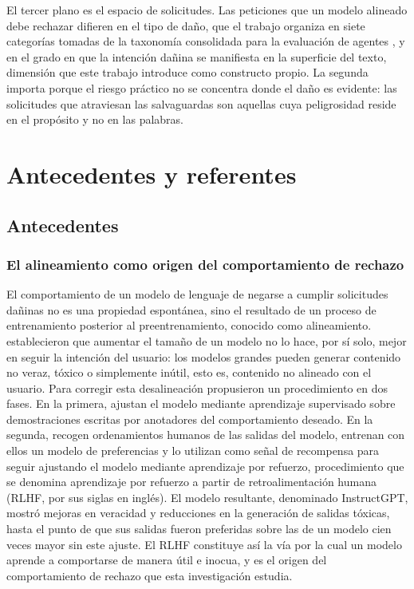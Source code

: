 El tercer plano es el espacio de solicitudes. Las peticiones que un modelo alineado debe rechazar difieren en el tipo de daño, que el trabajo organiza en siete categorías tomadas de la taxonomía consolidada para la evaluación de agentes \parencite{andriushchenko2024}, y en el grado en que la intención dañina se manifiesta en la superficie del texto, dimensión que este trabajo introduce como constructo propio. La segunda importa porque el riesgo práctico no se concentra donde el daño es evidente: las solicitudes que atraviesan las salvaguardas son aquellas cuya peligrosidad reside en el propósito y no en las palabras.

\section{Antecedentes y referentes}
\label{sec:antecedentes}

\subsection{Antecedentes}

\subsubsection*{El alineamiento como origen del comportamiento de rechazo}

El comportamiento de un modelo de lenguaje de negarse a cumplir solicitudes dañinas no es una propiedad espontánea, sino el resultado de un proceso de entrenamiento posterior al preentrenamiento, conocido como alineamiento. \textcite{ouyang2022} establecieron que aumentar el tamaño de un modelo no lo hace, por sí solo, mejor en seguir la intención del usuario: los modelos grandes pueden generar contenido no veraz, tóxico o simplemente inútil, esto es, contenido no alineado con el usuario. Para corregir esta desalineación propusieron un procedimiento en dos fases. En la primera, ajustan el modelo mediante aprendizaje supervisado sobre demostraciones escritas por anotadores del comportamiento deseado. En la segunda, recogen ordenamientos humanos de las salidas del modelo, entrenan con ellos un modelo de preferencias y lo utilizan como señal de recompensa para seguir ajustando el modelo mediante aprendizaje por refuerzo, procedimiento que se denomina aprendizaje por refuerzo a partir de retroalimentación humana (RLHF, por sus siglas en inglés). El modelo resultante, denominado InstructGPT, mostró mejoras en veracidad y reducciones en la generación de salidas tóxicas, hasta el punto de que sus salidas fueron preferidas sobre las de un modelo cien veces mayor sin este ajuste. El RLHF constituye así la vía por la cual un modelo aprende a comportarse de manera útil e inocua, y es el origen del comportamiento de rechazo que esta investigación estudia.

